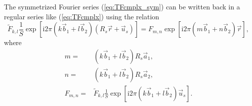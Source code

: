 \documentclass[a4paper]{article}
\newcommand{\mi}{\mathrm{i}}
\begin{document}
The symmetrized Fourier series (\ref{eq:TFcmplx_sym}) can be written back 
in a regular series like (\ref{eq:TFcmplx}) using the relation
\begin{equation*}
	\tilde{F}_{k,l} \frac{1}{S} \exp{\left[ \mi 2\pi \left( k\vec{b}_1 + l\vec{b}_2 \right)
				\left(R_s\vec{r} +\vec{u}_s\right) \right] }
				= F_{m,n} \exp{\left[ \mi 2\pi \left( m\vec{b}_1 + n\vec{b}_2 \right)\vec{r}  \right] },
\end{equation*}
where
\begin{align*}
	m =& \left( k\vec{b}_1 + l\vec{b}_2 \right) R_s \vec{a}_1 , \\
	n =& \left( k\vec{b}_1 + l\vec{b}_2 \right) R_s \vec{a}_2 ,\\
	F_{m,n} =& \tilde{F}_{k,l} \frac{1}{S} \exp{\left[ \mi 2\pi \left( k\vec{b}_1 + l\vec{b}_2 \right) \vec{u}_s \right]} .
\end{align*}
\end{document}
